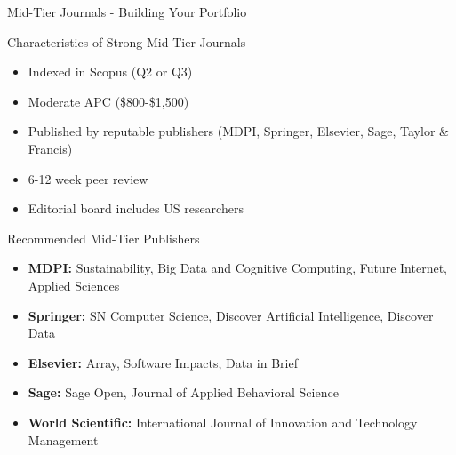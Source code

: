 \documentclass[11pt]{beamer}
\begin{document}
	\begin{frame}{Mid-Tier Journals - Building Your Portfolio}
		\scriptsize
		\begin{block}{Characteristics of Strong Mid-Tier Journals}
			\begin{itemize}
				\item Indexed in Scopus (Q2 or Q3)
				\item Moderate APC (\$800-\$1,500)
				\item Published by reputable publishers (MDPI, Springer, Elsevier, Sage, Taylor \& Francis)
				\item 6-12 week peer review
				\item Editorial board includes US researchers
			\end{itemize}
		\end{block}
		\begin{block}{Recommended Mid-Tier Publishers}
			\begin{itemize}
				\item \textbf{MDPI:} Sustainability, Big Data and Cognitive Computing, Future Internet, Applied Sciences
				\item \textbf{Springer:} SN Computer Science, Discover Artificial Intelligence, Discover Data
				\item \textbf{Elsevier:} Array, Software Impacts, Data in Brief
				\item \textbf{Sage:} Sage Open, Journal of Applied Behavioral Science
				\item \textbf{World Scientific:} International Journal of Innovation and Technology Management
			\end{itemize}
		\end{block}
	\end{frame}
	
\end{document}
